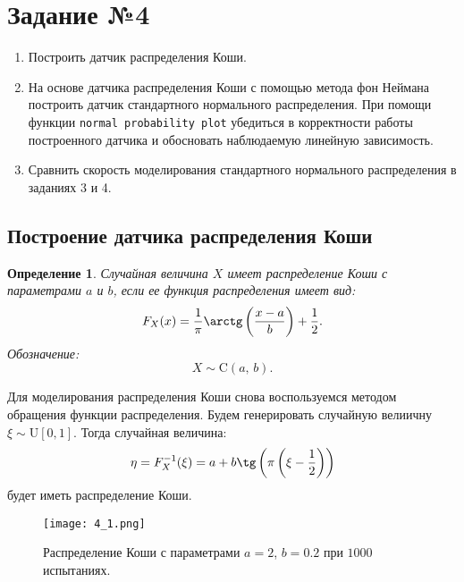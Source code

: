 \documentclass[a4paper, 11pt]{article}
\theoremstyle{def}
\newtheorem{definition}{Определение}[section]
\theoremstyle{th}
\theoremstyle{rem}
\begin{document}
\section{Задание №4}

\begin{enumerate}
        \item Построить датчик распределения Коши.
        \item На основе датчика распределения Коши с помощью метода фон Неймана построить датчик стандартного нормального распределения. При помощи функции \texttt{normal probability plot} убедиться в корректности работы построенного датчика и обосновать наблюдаемую линейную зависимость.
        \item Сравнить скорость моделирования стандартного нормального распределения в заданиях 3 и 4.
\end{enumerate}


\subsection{Построение датчика распределения Коши}

\begin{definition}
        Случайная величина $X$ \textit{имеет распределение Коши с параметрами $a$ и $b$}, если ее функция распределения имеет вид:
$$
        F_X(x) = \frac{1}{\pi}\arctg\left(\frac{x-a}{b}\right) + \frac{1}{2}.
$$ 
        Обозначение:
$$
        X \sim \mbox{C}(a,\,b).
$$
\end{definition}
Для моделирования распределения Коши снова воспользуемся методом обращения функции распределения. Будем генерировать случайную велиичну $\xi \sim \mbox{U}[0, 1].$ Тогда случайная величина:
$$
\displaystyle
\eta = F_X^{-1}(\xi) = a + b \tg\left(\pi\left(\xi - \frac{1}{2}\right)\right)
$$
будет иметь распределение Коши.
\begin{figure}[H]
        \centering
        \texttt{[image: 4\_1.png]}
        \caption{Распределение Коши с параметрами $a = 2$, $b = 0.2$ при $1000$ испытаниях.}
\end{figure}
\end{document}
